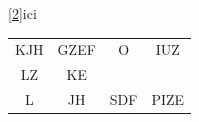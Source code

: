\documentclass[10pt,a4paper]{report}
\begin{document}
\jambon

\ref{2}{ici}

\begin{tabular}{cccc}
KJH & GZEF & O & IUZ \\
LZ & KE & & \\
L & JH & SDF & PIZE \\
\end{tabular}
\end{document}
